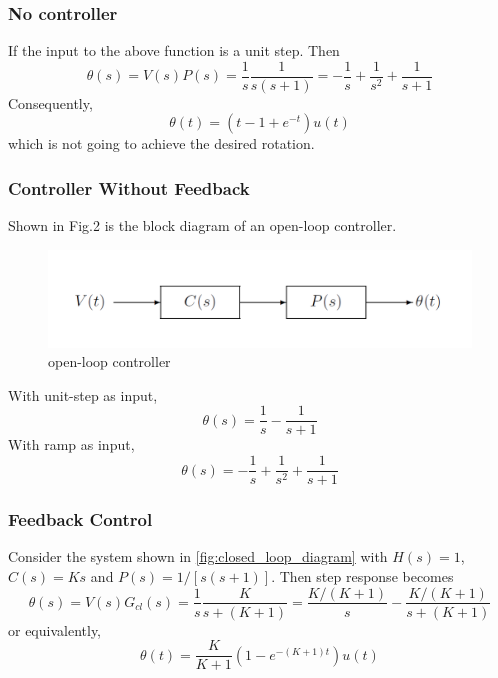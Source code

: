 \documentclass[a4paper]{article}
\begin{document}
            \subsubsection{No controller}
            If the input to the above function is a unit step. Then
            \begin{equation*}
                \theta(s) = V(s)P(s) = \frac{1}{s}\frac{1}{s(s+1)} = -\frac{1}{s} + \frac{1}{s^2} + \frac{1}{s+1}
            \end{equation*}
            Consequently, 
            \begin{equation*}
                \theta(t) = (t-1+e^{-t})u(t)
            \end{equation*}
            which is not going to achieve the desired rotation.

            \subsubsection{Controller Without Feedback}
            Shown in Fig.2 is the block diagram of an open-loop controller.
            \begin{figure}[H]
                \centering
                \includegraphics[width=12cm]{openloop.png}
                \caption{open-loop controller}
            \end{figure}

            With unit-step as input,
            \begin{equation*}
                \theta(s) = \frac{1}{s} - \frac{1}{s+1}
            \end{equation*}
            With ramp as input,
            \begin{equation*}
                \theta(s) = -\frac{1}{s} + \frac{1}{s^2} + \frac{1}{s+1}
            \end{equation*}


            \subsubsection{Feedback Control}
            Consider the system shown in \autoref{fig:closed_loop_diagram} with $H(s)=1$, $C(s)=Ks$ and $P(s) = 1/[s(s+1)]$. Then step response becomes
            \begin{equation*}
                \theta(s) = V(s)G_{cl}(s) = \frac{1}{s}\frac{K}{s+(K+1)} = \frac{K/(K+1)}{s} - \frac{K/(K+1)}{s+(K+1)}
            \end{equation*}
            or equivalently, 
            \begin{equation*}
                \theta(t) = \frac{K}{K+1}(1-e^{-(K+1)t})u(t)
            \end{equation*}
\end{document}
